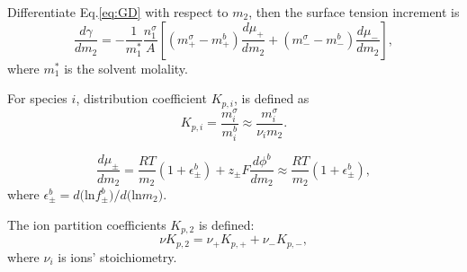 Differentiate Eq.\thinspace\ref{eq:GD} with respect to $m_2$, then
the surface tension increment is
\begin{equation}
\frac{d\gamma}{dm_2} = -\frac{1}{m_1^*}\frac{n_1^{\sigma}}{A} [(m_+^{\sigma} -m_+^{b})\frac{d\mu_+}{dm_2} + (m_-^{\sigma} -m_-^b)\frac{d\mu_-}{dm_2}],
\label{eq:h}
\end{equation}
where $m_1^*$ is the solvent molality. 

For species $i$, distribution coefficient $K_{p,i}$, is defined as
\begin{equation}
K_{p,i}= \frac{m_i^{\sigma}}{m_i^b} \approx \frac{m_i^{\sigma}}{\nu_i m_2}.
\label{eq:i}
\end{equation}

\begin{equation}
\frac{d\mu_{\pm}}{dm_2} =\frac{RT}{m_2} (1+\epsilon_{\pm}^b) + z_{\pm}F\frac{d\phi^{b}}{dm_2} \approx \frac{RT}{m_2} (1+\epsilon_{\pm}^b) ,
\label{eq:i1}
\end{equation}
where $\epsilon_{\pm}^b=d($ln$f_{\pm}^b)/d($ln$m_2)$. 

The ion partition coefficients $K_{p,2}$ is defined:
\begin{equation}
\nu K_{p,2}= \nu_+ K_{p,+} + \nu_- K_{p,-},
\label{eq:j}
\end{equation}
where $\nu_i$ is ions' stoichiometry.


